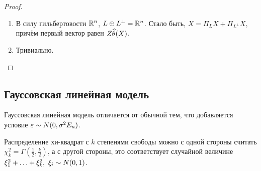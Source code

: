 \begin{proof}~
	\begin{enumerate}
		\item В силу гильбертовости $\mathbb{R}^n$, $L \oplus L^\bot = \mathbb{R}^n$. Стало быть, $X = \Pi_L X + \Pi_{L^\bot} X$, причём первый вектор равен $Z\widehat{\theta}(X)$.
		
		\item Тривиально.
	\end{enumerate}
\end{proof}

\subsection{Гауссовская линейная модель}

\begin{note}
	Гауссовская линейная модель отличается от обычной тем, что добавляется условие $\varepsilon \sim N(0, \sigma^2E_n)$.
\end{note}

\begin{reminder}
	Распределение хи-квадрат с $k$ степенями свободы можно с одной стороны считать $\chi_k^2 = \Gamma(\frac{1}{2}, \frac{k}{2})$, а с другой стороны, это соответствует случайной величине $\xi_1^2 + \ldots + \xi_k^2,\ \xi_i \sim N(0, 1)$.
\end{reminder}